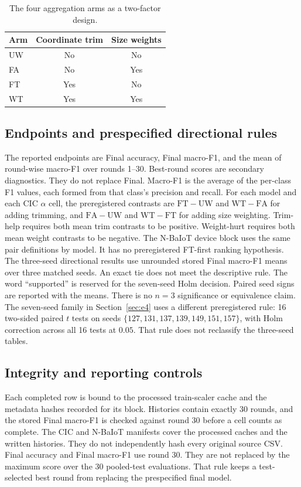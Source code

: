 \documentclass{ieeeaccess}
\begin{document}
\begin{table}[!t]
\centering
\caption{The four aggregation arms as a two-factor design.}
\label{tab:factorial}
\small
\begin{tabular}{lcc}
\hline
Arm & Coordinate trim & Size weights \\
\hline
UW & No & No \\
FA & No & Yes \\
FT & Yes & No \\
WT & Yes & Yes \\
\hline
\end{tabular}
\end{table}

\subsection{Endpoints and prespecified directional rules}
The reported endpoints are Final accuracy, Final macro-F1, and the mean of round-wise macro-F1 over rounds 1--30. Best-round scores are secondary diagnostics. They do not replace Final. Macro-F1 is the average of the per-class F1 values, each formed from that class's precision and recall. For each model and each CIC $\alpha$ cell, the preregistered contrasts are $\mathrm{FT}-\mathrm{UW}$ and $\mathrm{WT}-\mathrm{FA}$ for adding trimming, and $\mathrm{FA}-\mathrm{UW}$ and $\mathrm{WT}-\mathrm{FT}$ for adding size weighting. Trim-help requires both mean trim contrasts to be positive. Weight-hurt requires both mean weight contrasts to be negative. The N-BaIoT device block uses the same pair definitions by model. It has no preregistered FT-first ranking hypothesis. The three-seed directional results use unrounded stored Final macro-F1 means over three matched seeds. An exact tie does not meet the descriptive rule. The word ``supported'' is reserved for the seven-seed Holm decision. Paired seed signs are reported with the means. There is no $n=3$ significance or equivalence claim. The seven-seed family in Section~\ref{sec:e4} uses a different preregistered rule: 16 two-sided paired $t$ tests on seeds $\{127,131,137,139,149,151,157\}$, with Holm correction across all 16 tests at $0.05$. That rule does not reclassify the three-seed tables.

\subsection{Integrity and reporting controls}
Each completed row is bound to the processed train-scaler cache and the metadata hashes recorded for its block. Histories contain exactly 30 rounds, and the stored Final macro-F1 is checked against round 30 before a cell counts as complete. The CIC and N-BaIoT manifests cover the processed caches and the written histories. They do not independently hash every original source CSV. Final accuracy and Final macro-F1 use round 30. They are not replaced by the maximum score over the 30 pooled-test evaluations. That rule keeps a test-selected best round from replacing the prespecified final model.
\end{document}
